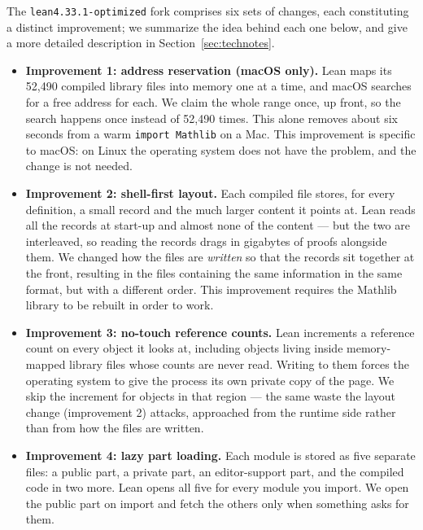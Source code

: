 \documentclass{article}
\newcommand{\Lean}{Lean\xspace}      %
\newcommand{\mathlib}{Mathlib\xspace}
\newcommand{\altlean}{\texttt{lean4.33.1-\allowbreak optimized}\xspace}
\begin{document}
\label{sec:intro-improvements} 

The \altlean fork comprises six sets of changes, each constituting a distinct improvement; we summarize the idea behind each one below, and give a more detailed description in Section~\ref{sec:technotes}.

\begin{itemize}
\item \textbf{Improvement 1: address reservation (macOS only).} \Lean maps its 52{,}490 compiled library files into memory one at a time, and macOS searches for a free address for each. We claim the whole range once, up front, so the search happens once instead of 52{,}490 times. This alone removes about six seconds from a warm \texttt{import Mathlib} on a Mac. This improvement is specific to macOS: on Linux the operating system does not have the problem, and the change is not needed.

\item \textbf{Improvement 2: shell-first layout.} Each compiled file stores, for every definition, a small record and the much larger content it points at. \Lean reads all the records at start-up and almost none of the content --- but the two are interleaved, so reading the records drags in gigabytes of proofs alongside them. We changed how the files are \emph{written} so that the records sit together at the front, resulting in the files containing the same information in the same format, but with a different order. This improvement requires the \mathlib library to be rebuilt in order to work.

\item \textbf{Improvement 3: no-touch reference counts.} \Lean increments a reference count on every object it looks at, including objects living inside memory-mapped library files whose counts are never read. Writing to them forces the operating system to give the process its own private copy of the page. We skip the increment for objects in that region --- the same waste the layout change (improvement 2) attacks, approached from the runtime side rather than from how the files are written.

\item \textbf{Improvement 4: lazy part loading.} Each module is stored as five separate files: a public part, a private part, an editor-support part, and the compiled code in two more. \Lean opens all five for every module you import. We open the public part on import and fetch the others only when something asks for them.


\end{itemize}
\end{document}
